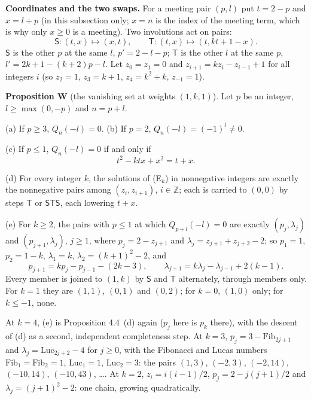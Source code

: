 \documentclass[11pt]{article}
\begin{document}
\medskip
\noindent\textbf{Coordinates and the two swaps.} For a meeting pair $(p,l)$ put $t=2-p$ and $x=l+p$ (in this subsection only; $x=n$ is the index of the meeting term, which is why only $x\ge0$ is a meeting). Two involutions act on pairs:
\[
\mathsf{S}:(t,x)\mapsto(x,t),\qquad \mathsf{T}:(t,x)\mapsto(t,kt+1-x).
\]
$\mathsf{S}$ is the other $p$ at the same $l$, $p'=2-l-p$; $\mathsf{T}$ is the other $l$ at the same $p$, $l'=2k+1-(k+2)p-l$.
Let $z_0=z_1=0$ and $z_{i+1}=kz_i-z_{i-1}+1$ for all integers $i$ (so $z_2=1$, $z_3=k+1$, $z_4=k^2+k$, $z_{-1}=1$).

\medskip
\noindent\textbf{Proposition W} (the vanishing set at weights $(1,k,1)$). Let $p$ be an integer, $l\ge\max(0,-p)$ and $n=p+l$.

(a) If $p\ge3$, $Q_n(-l)=0$. (b) If $p=2$, $Q_n(-l)=(-1)^l\ne0$.

(c) If $p\le1$, $Q_n(-l)=0$ if and only if
\[
t^2-ktx+x^2=t+x.\tag{E$_k$}
\]

(d) For every integer $k$, the solutions of (E$_k$) in nonnegative integers are exactly the nonnegative pairs among $(z_i,z_{i+1})$, $i\in\mathbb{Z}$; each is carried to $(0,0)$ by steps $\mathsf{T}$ or $\mathsf{S}\mathsf{T}\mathsf{S}$, each lowering $t+x$.

(e) For $k\ge2$, the pairs with $p\le1$ at which $Q_{p+l}(-l)=0$ are exactly $(p_j,\lambda_j)$ and $(p_{j+1},\lambda_j)$, $j\ge1$, where $p_j=2-z_{j+1}$ and $\lambda_j=z_{j+1}+z_{j+2}-2$; so $p_1=1$, $p_2=1-k$, $\lambda_1=k$, $\lambda_2=(k+1)^2-2$, and
\[
p_{j+1}=kp_j-p_{j-1}-(2k-3),\qquad \lambda_{j+1}=k\lambda_j-\lambda_{j-1}+2(k-1).
\]
Every member is joined to $(1,k)$ by $\mathsf{S}$ and $\mathsf{T}$ alternately, through members only. For $k=1$ they are $(1,1)$, $(0,1)$ and $(0,2)$; for $k=0$, $(1,0)$ only; for $k\le-1$, none.

\smallskip
At $k=4$, (e) is Proposition 4.4~(d) again ($p_j$ here is $p_k$ there), with the descent of (d) as a second, independent completeness step. At $k=3$, $p_j=3-\mathrm{Fib}_{2j+1}$ and $\lambda_j=\mathrm{Luc}_{2j+2}-4$ for $j\ge0$, with the Fibonacci and Lucas numbers $\mathrm{Fib}_1=\mathrm{Fib}_2=1$, $\mathrm{Luc}_1=1$, $\mathrm{Luc}_2=3$: the pairs $(1,3)$, $(-2,3)$, $(-2,14)$, $(-10,14)$, $(-10,43)$, \dots. At $k=2$, $z_i=i(i-1)/2$, $p_j=2-j(j+1)/2$ and $\lambda_j=(j+1)^2-2$: one chain, growing quadratically.
\end{document}
